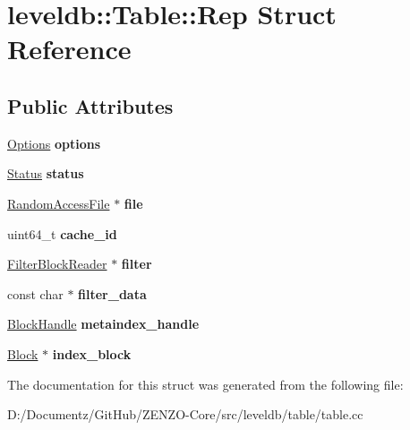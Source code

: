 \hypertarget{structleveldb_1_1_table_1_1_rep}{}\section{leveldb\+::Table\+::Rep Struct Reference}
\label{structleveldb_1_1_table_1_1_rep}
\subsection*{Public Attributes}
\begin{DoxyCompactItemize}
\item 
\mbox{\label{structleveldb_1_1_table_1_1_rep_a96ff2b389369e1b0706b090961065740}} 
\mbox{\hyperlink{structleveldb_1_1_options}{Options}} {\bfseries options}
\item 
\mbox{\label{structleveldb_1_1_table_1_1_rep_aceaddad6024db9f34af2358503e4c089}} 
\mbox{\hyperlink{classleveldb_1_1_status}{Status}} {\bfseries status}
\item 
\mbox{\label{structleveldb_1_1_table_1_1_rep_a5b96b0d545bb3dbe2bccdefab1a83092}} 
\mbox{\hyperlink{classleveldb_1_1_random_access_file}{Random\+Access\+File}} $\ast$ {\bfseries file}
\item 
\mbox{\label{structleveldb_1_1_table_1_1_rep_af5beb2186a60560f5381271ad53420b8}} 
uint64\+\_\+t {\bfseries cache\+\_\+id}
\item 
\mbox{\label{structleveldb_1_1_table_1_1_rep_a35acf83732a3dea3df5869cb05c1cb5f}} 
\mbox{\hyperlink{classleveldb_1_1_filter_block_reader}{Filter\+Block\+Reader}} $\ast$ {\bfseries filter}
\item 
\mbox{\label{structleveldb_1_1_table_1_1_rep_a2dd458aa96c0a357414f13354810cea9}} 
const char $\ast$ {\bfseries filter\+\_\+data}
\item 
\mbox{\label{structleveldb_1_1_table_1_1_rep_a11500653a2db8ba301bca5027a508789}} 
\mbox{\hyperlink{classleveldb_1_1_block_handle}{Block\+Handle}} {\bfseries metaindex\+\_\+handle}
\item 
\mbox{\label{structleveldb_1_1_table_1_1_rep_ae69d991c9b8ec7330b22acc06a932fe8}} 
\mbox{\hyperlink{classleveldb_1_1_block}{Block}} $\ast$ {\bfseries index\+\_\+block}
\end{DoxyCompactItemize}


The documentation for this struct was generated from the following file\+:\begin{DoxyCompactItemize}
\item 
D\+:/\+Documentz/\+Git\+Hub/\+Z\+E\+N\+Z\+O-\/\+Core/src/leveldb/table/table.\+cc\end{DoxyCompactItemize}

